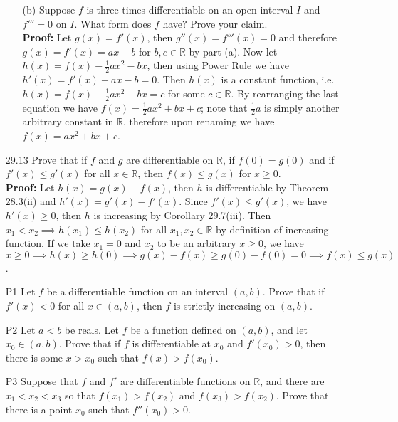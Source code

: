 \documentclass{article}
\begin{document}
\begin{itemize}
\begin{itemize}
              \item [(b)] Suppose $f$ is three times differentiable on an open interval $I$ and $f'''=0$ on $I$. What form does $f$ have? Prove your claim.\\\textbf{Proof: } Let $g(x)=f'(x)$, then $g''(x)=f'''(x)=0$ and therefore $g(x)=f'(x)=ax+b$ for $b,c\in\mathbb{R}$ by part (a). Now let $h(x)=f(x)-\frac{1}{2}ax^2-bx$, then using Power Rule we have $h'(x)=f'(x)-ax-b=0$. Then $h(x)$ is a constant function, i.e. $h(x)=f(x)-\frac{1}{2}ax^2-bx=c$ for some $c\in\mathbb{R}$. By rearranging the last equation we have $f(x)=\frac{1}{2}ax^2+bx+c$; note that $\frac{1}{2}a$ is simply another arbitrary constant in $\mathbb{R}$, therefore upon renaming we have $f(x)=ax^2+bx+c$.
          \end{itemize}
    \item [29.13] Prove that if $f$ and $g$ are differentiable on $\mathbb{R}$, if $f(0)=g(0)$ and if $f'(x)\leq g'(x)$ for all $x\in\mathbb{R}$, then $f(x)\leq g(x)$ for $x\geq 0$.\\\textbf{Proof: } Let $h(x)=g(x)-f(x)$, then $h$ is differentiable by Theorem 28.3(ii) and $h'(x)=g'(x)-f'(x)$. Since $f'(x)\leq g'(x)$, we have $h'(x)\geq 0$, then $h$ is increasing by Corollary 29.7(iii). Then $x_1<x_2\implies h(x_1)\leq h(x_2)$ for all $x_1,x_2\in\mathbb{R}$ by definition of increasing function. If we take $x_1=0$ and $x_2$ to be an arbitrary $x\geq 0$, we have $x\geq 0\implies h(x)\geq h(0)\implies g(x)-f(x)\geq g(0)-f(0)=0\implies f(x)\leq g(x)$.
    \item [P1] Let $f$ be a differentiable function on an interval $(a,b)$. Prove that if $f'(x)<0$ for all $x\in(a,b)$, then $f$ is strictly increasing on $(a,b)$.
    \item [P2] Let $a<b$ be reals. Let $f$ be a function defined on $(a,b)$, and let $x_0\in(a,b)$. Prove that if $f$ is differentiable at $x_0$ and $f'(x_0)>0$, then there is some $x>x_0$ such that $f(x)>f(x_0)$.
    \item [P3] Suppose that $f$ and $f'$ are differentiable functions on $\mathbb{R}$, and there are $x_1<x_2<x_3$ so that $f(x_1)>f(x_2)$ and $f(x_3)>f(x_2)$. Prove that there is a point $x_0$ such that $f''(x_0)>0$.
\end{itemize}
\end{document}
